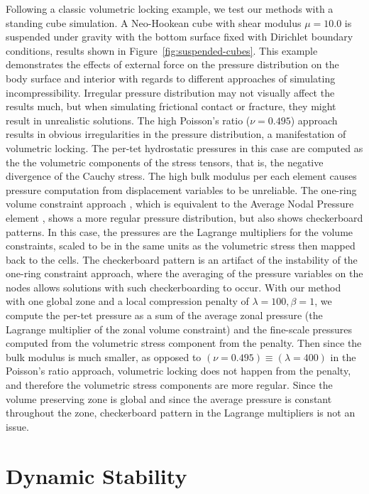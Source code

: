 Following a classic volumetric locking example, we test our methods with a standing cube simulation. A Neo-Hookean cube with shear modulus $\mu = 10.0$ is suspended under gravity with the bottom surface fixed with Dirichlet boundary conditions, results shown in Figure~\ref{fig:suspended-cubes}. This example demonstrates the effects of external force on the pressure distribution on the body surface and interior with regards to different approaches of simulating incompressibility. Irregular pressure distribution may not visually affect the results much, but when simulating frictional contact or fracture, they might result in unrealistic solutions. The high Poisson's ratio ($\nu = 0.495$) approach results in obvious irregularities in the pressure distribution, a manifestation of volumetric locking. The per-tet hydrostatic pressures in this case are computed as the the volumetric components of the stress tensors, that is, the negative divergence of the Cauchy stress. The high bulk modulus per each element causes pressure computation from displacement variables to be unreliable. The one-ring volume constraint approach \cite{Irving:2007}, which is equivalent to the Average Nodal Pressure element \cite{bonet:1998}, shows a more regular pressure distribution, but also shows checkerboard patterns. In this case, the pressures are the Lagrange multipliers for the volume constraints, scaled to be in the same units as the volumetric stress then mapped back to the cells. The checkerboard pattern is an artifact of the instability of the one-ring constraint approach, where the averaging of the pressure variables on the nodes allows solutions with such checkerboarding to occur. With our method with one global zone and a local compression penalty of $\lambda = 100, \beta = 1$, we compute the per-tet pressure as a sum of the average zonal pressure (the Lagrange multiplier of the zonal volume constraint) and the fine-scale pressures computed from the volumetric stress component from the penalty. Then since the bulk modulus is much smaller, as opposed to $(\nu = 0.495) \equiv (\lambda = 400)$ in the Poisson's ratio approach, volumetric locking does not happen from the penalty, and therefore the volumetric stress components are more regular. Since the volume preserving zone is global and since the average pressure is constant throughout the zone, checkerboard pattern in the Lagrange multipliers is not an issue. 

\section{Dynamic Stability}

